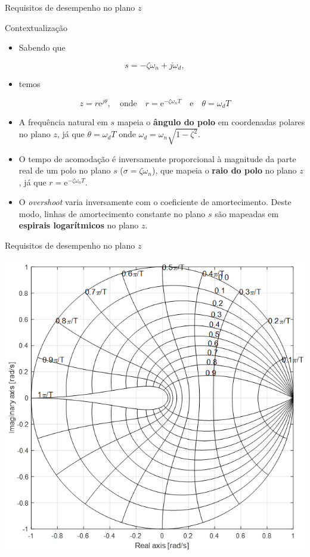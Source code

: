 \begin{frame}{Requisitos de desempenho no plano $z$}
\begin{block}{Contextualização}
	\begin{itemize}
		\item Sabendo que
	\end{itemize}
$$s = -\zeta \omega_n + j \omega_d,$$
	\begin{itemize}
		\item[] temos
	\end{itemize}
$$z = r\text{e}^{j\theta}, \quad \text{onde} \quad r = \text{e}^{-\zeta \omega_n T} \quad \text{e} \quad \theta = \omega_d T$$
\vspace{-0.3cm}
	\begin{itemize}
		\item A frequência natural em $s$ mapeia o \textbf{ângulo do polo} em coordenadas polares no plano $z$, já que $\theta = \omega_d T$ onde $\omega_d = \omega_n \sqrt{1 - \zeta^2}$.
		\item O tempo de acomodação é inversamente proporcional à magnitude da parte real de um polo no plano $s$ ($\sigma = \zeta \omega_n$), que mapeia o \textbf{raio do polo} no plano $z$, já que $r = \text{e}^{-\zeta \omega_n T}$.
		\item O \textit{overshoot} varia inversamente com o coeficiente de amortecimento. Deste modo, linhas de amortecimento constante no plano $s$ são mapeadas em \textbf{espirais logarítmicos} no plano $z$.
	\end{itemize}
\end{block}
\end{frame}

\begin{frame}{Requisitos de desempenho no plano $z$}
\centerline{\includegraphics[width=0.65\linewidth]{Figuras/Ch11/fig2.png}}
\end{frame}

